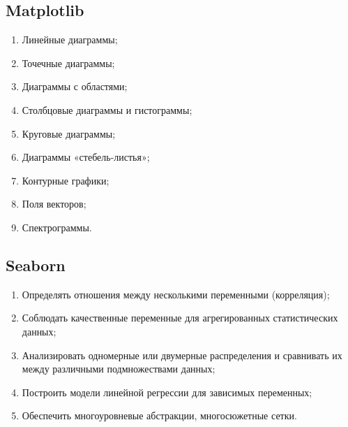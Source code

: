 \subsection{Matplotlib}

\begin{enumerate}
	\item Линейные диаграммы;
	\item Точечные диаграммы;
	\item Диаграммы с областями;
	\item Столбцовые диаграммы и гистограммы;
	\item Круговые диаграммы;
	\item Диаграммы «стебель-листья»;
	\item Контурные графики;
	\item Поля векторов;
	\item Спектрограммы.
\end{enumerate}

\subsection{Seaborn}

\begin{enumerate}
	\item Определять отношения между несколькими переменными (корреляция);
	\item Соблюдать качественные переменные для агрегированных статистических данных;
	\item Анализировать одномерные или двумерные распределения и сравнивать их между различными подмножествами данных;
	\item Построить модели линейной регрессии для зависимых переменных;	
	\item Обеспечить многоуровневые абстракции, многосюжетные сетки.
\end{enumerate}

\newpage